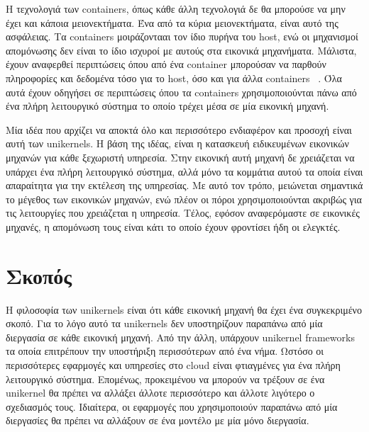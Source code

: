 Η τεχνολογιά των containers, όπως κάθε άλλη τεχνολογιά δε θα μπορούσε να μην
έχει και κάποια μειονεκτήματα. Ένα από τα κύρια μειονεκτήματα, είναι αυτό της
ασφάλειας. Τα containers μοιράζοντααι τον ίδιο πυρήνα του host, ενώ οι
μηχανισμοί απομόνωσης δεν είναι το ίδιο ισχυροί με αυτούς στα εικονικά
μηχανήματα. Μάλιστα, έχουν αναφερθεί περιπτώσεις όπου από ένα container
μπορούσαν να παρθούν πληροφορίες και δεδομένα τόσο για το host, όσο και για άλλα
containers ~\cite{gao2017containerleaks}. Όλα αυτά έχουν οδηγήσει σε περιπτώσεις
όπου τα containers χρησιμοποιούνται πάνω από ένα πλήρη λειτουργικό σύστημα το
οποίο τρέχει μέσα σε μία εικονική μηχανή.

Μία ιδέα που αρχίζει να αποκτά όλο και περισσότερο ενδιαφέρον και προσοχή 
είναι αυτή των unikernels. Η βάση της ιδέας, είναι  η
κατασκευή ειδικευμένων εικονικών μηχανών για κάθε ξεχωριστή υπηρεσία. Στην
εικονική αυτή μηχανή δε χρειάζεται να υπάρχει ένα πλήρη λειτουργικό σύστημα,
αλλά μόνο τα κομμάτια αυτού τα οποία είναι απαραίτητα για την εκτέλεση της
υπηρεσίας. Με αυτό τον τρόπο, μειώνεται σημαντικά το μέγεθος των εικονικών
μηχανών, ενώ πλέον οι πόροι χρησιμοποιούνται ακριβώς για τις λειτουργίες που
χρειάζεται η υπηρεσία. Τέλος, εφόσον αναφερόμαστε σε εικονικές μηχανές, η
απομόνωση τους είναι κάτι το οποίο έχουν φροντίσει ήδη οι ελεγκτές. 

\section{Σκοπός}

Η φιλοσοφία των unikernels είναι ότι κάθε εικονική μηχανή θα έχει ένα
συγκεκριμένο σκοπό. Για το λόγο αυτό τα unikernels δεν υποστηρίζουν παραπάνω
από μία διεργασία σε κάθε εικονική μηχανή. Από την άλλη, υπάρχουν unikernel
frameworks τα οποία επιτρέπουν την υποστήριξη περισσότερων από ένα νήμα. Ωστόσο
οι περισσότερες εφαρμογές και υπηρεσίες στο cloud είναι φτιαγμένες για ένα πλήρη
λειτουργικό σύστημα. Επομένως, προκειμένου να μπορούν να τρέξουν σε ένα
unikernel θα πρέπει να αλλάξει άλλοτε περισσότερο και άλλοτε λιγότερο ο
σχεδιασμός τους. Ιδιαίτερα, οι εφαρμογές που χρησιμοποιούν παραπάνω από μία
διεργασίες θα πρέπει να αλλάξουν σε ένα μοντέλο με μία μόνο διεργασία. 


